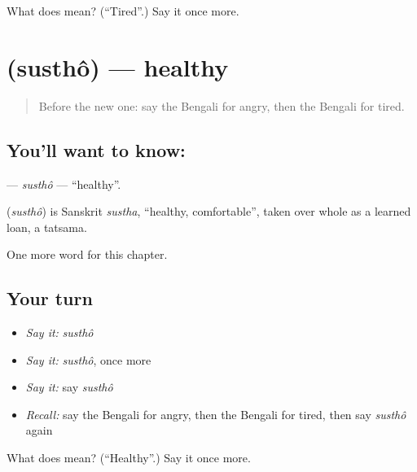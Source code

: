 \begin{tcolorbox}[breakable,colback=teal!4,colframe=teal!35!black,title={Before you move on}]
What does  mean? (\textquotedblleft{}Tired\textquotedblright{}.) Say it once more.
\end{tcolorbox}
\section[\texorpdfstring{\bn{সুস্থ} (susthô)}{সুস্থ (susthô)}]{ (susthô) — healthy}

\label{lesson:BN-C137-sustho}



\begin{quote}
Before the new one: say the Bengali for angry, then the Bengali for tired.
\end{quote}

\subsection*{You'll want to know: }
\textbf{} — \emph{susthô} — \textquotedblleft{}healthy\textquotedblright{}.

\begin{cousinweb}
\textbf{} (\emph{susthô}) is Sanskrit \emph{sustha}, \textquotedblleft{}healthy, comfortable\textquotedblright{}, taken over whole as a learned loan, a tatsama.
\end{cousinweb}

\begin{grammarlens}[title={What you've built}]
One more word for this chapter.
\end{grammarlens}

\subsection*{Your turn}
\begin{itemize}
\raggedright
  \item \emph{Say it:} \emph{susthô}
  \item \emph{Say it:} \emph{susthô}, once more
  \item \emph{Say it:} say \emph{susthô}
  \item \emph{Recall:} say the Bengali for angry, then the Bengali for tired, then say \emph{susthô} again
\end{itemize}

\begin{tcolorbox}[breakable,colback=teal!4,colframe=teal!35!black,title={Before you move on}]
What does  mean? (\textquotedblleft{}Healthy\textquotedblright{}.) Say it once more.
\end{tcolorbox}
